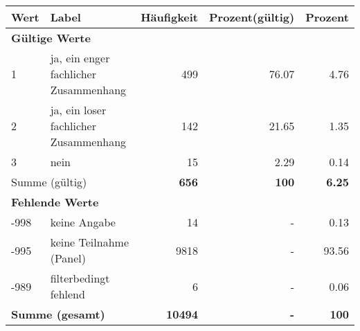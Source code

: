      \begin{longtable}{lXrrr}
     \toprule
     \textbf{Wert} & \textbf{Label} & \textbf{Häufigkeit} & \textbf{Prozent(gültig)} & \textbf{Prozent} \\
     \endhead
     \midrule
     \multicolumn{5}{l}{\textbf{Gültige Werte}}\\

     1 &
     \multicolumn{1}{X}{ ja, ein enger fachlicher Zusammenhang   } &


       \num{499} &
       \num[round-mode=places,round-precision=2]{76,07} &
         \num[round-mode=places,round-precision=2]{4,76} \\

     2 &
     \multicolumn{1}{X}{ ja, ein loser fachlicher Zusammenhang   } &


       \num{142} &
       \num[round-mode=places,round-precision=2]{21,65} &
         \num[round-mode=places,round-precision=2]{1,35} \\

     3 &
     \multicolumn{1}{X}{ nein   } &


       \num{15} &
       \num[round-mode=places,round-precision=2]{2,29} &
         \num[round-mode=places,round-precision=2]{0,14} \\
     \midrule
     \multicolumn{2}{l}{Summe (gültig)} &
       \textbf{\num{656}} &
     \textbf{100} &
       \textbf{\num[round-mode=places,round-precision=2]{6,25}} \\
     \multicolumn{5}{l}{\textbf{Fehlende Werte}}\\
       -998 &
       keine Angabe &
         \num{14} &
        - &
         \num[round-mode=places,round-precision=2]{0,13} \\
       -995 &
       keine Teilnahme (Panel) &
         \num{9818} &
        - &
         \num[round-mode=places,round-precision=2]{93,56} \\
       -989 &
       filterbedingt fehlend &
         \num{6} &
        - &
         \num[round-mode=places,round-precision=2]{0,06} \\
     \midrule
     \multicolumn{2}{l}{\textbf{Summe (gesamt)}} &
          \textbf{\num{10494}} &
        \textbf{-} &
        \textbf{100} \\
     \bottomrule
     \end{longtable}
     
